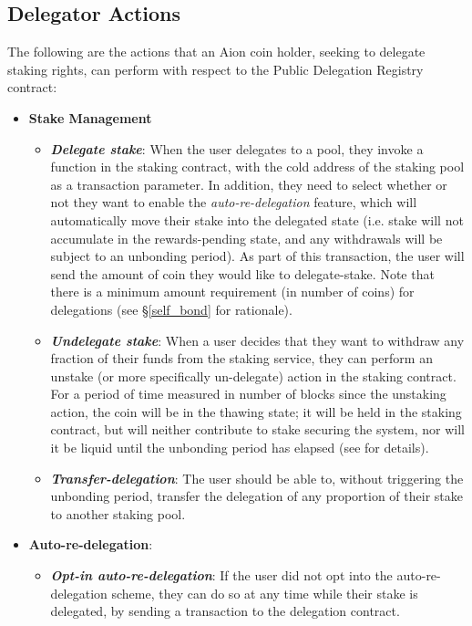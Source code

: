 \subsection{Delegator Actions}
The following are the actions that an Aion coin holder, seeking to delegate staking rights, can perform with respect to the Public Delegation Registry contract: 
\begin{itemize}
    \item \textbf{Stake Management}
    \begin{itemize}
        \item \textit{\textbf{Delegate stake}}: When the user delegates to a pool, they invoke a function in the staking contract, with the cold address of the staking pool as a transaction parameter. In addition, they need to select whether or not they want to enable the \textit{auto-re-delegation} feature, which will automatically move their stake into the delegated state (i.e. stake will not accumulate in the rewards-pending state, and any withdrawals will be subject to an unbonding period). As part of this transaction, the user will send the amount of coin they would like to delegate-stake. Note that there is a minimum amount requirement (in number of coins) for delegations (see \S\ref{self_bond} for rationale). 
        \item \textit{\textbf{Undelegate stake}}: When a user decides that they want to withdraw any fraction of their funds from the staking service, they can perform an unstake (or more specifically un-delegate) action in the staking contract. For a period of time measured in number of blocks since the unstaking action, the coin will be in the thawing state; it will be held in the staking contract, but will neither contribute to stake securing the system, nor will it be liquid until the unbonding period has elapsed (see \cite{WZS19} for details).
        \item \textit{\textbf{Transfer-delegation}}: The user should be able to, without triggering the unbonding period, transfer the delegation of any proportion of their stake to another staking pool.
    \end{itemize}
    \item \textbf{Auto-re-delegation}: 
    \begin{itemize}
        \item \textit{\textbf{Opt-in auto-re-delegation}}: If the user did not opt into the auto-re-delegation scheme, they can do so at any time while their stake is delegated, by sending a transaction to the delegation contract. 

\end{itemize}
\end{itemize}
